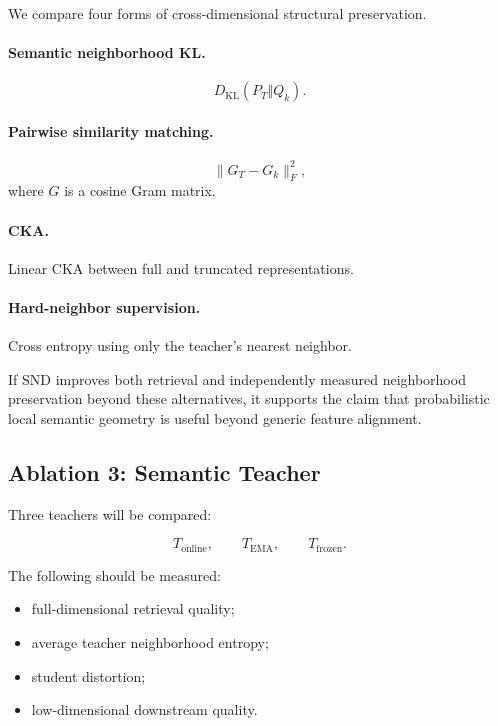 \documentclass[11pt]{article}
\newcommand{\KL}{D_{\mathrm{KL}}}
\begin{document}
We compare four forms of cross-dimensional structural preservation.

\paragraph{Semantic neighborhood KL.}
\begin{equation}
    \KL(P_T\Vert Q_k).
\end{equation}

\paragraph{Pairwise similarity matching.}
\begin{equation}
    \|
        G_T-G_k
    \|_F^2,
\end{equation}
where $G$ is a cosine Gram matrix.

\paragraph{CKA.}
Linear CKA between full and truncated representations.

\paragraph{Hard-neighbor supervision.}
Cross entropy using only the teacher's nearest neighbor.

If SND improves both retrieval and independently measured neighborhood preservation beyond these alternatives, it supports the claim that probabilistic local semantic geometry is useful beyond generic feature alignment.


\subsection{Ablation 3: Semantic Teacher}

Three teachers will be compared:

\begin{equation}
    T_{\mathrm{online}},
    \qquad
    T_{\mathrm{EMA}},
    \qquad
    T_{\mathrm{frozen}}.
\end{equation}

The following should be measured:

\begin{itemize}[leftmargin=1.5em]
    \item full-dimensional retrieval quality;
    \item average teacher neighborhood entropy;
    \item student distortion;
    \item low-dimensional downstream quality.
\end{itemize}
\end{document}
